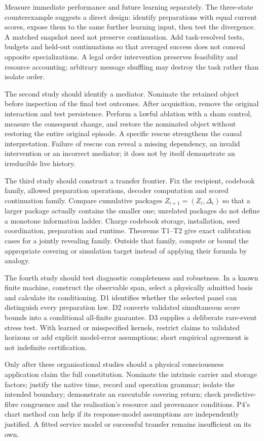 \documentclass[
  11pt,
  a4paper,
]{article}
\begin{document}
Measure immediate performance and future learning separately. The
three-state counterexample suggests a direct design: identify
preparations with equal current scores, expose them to the same further
learning input, then test the divergence. A matched snapshot need not
preserve continuation. Add task-resolved tests, budgets and held-out
continuations so that averaged success does not conceal opposite
specializations. A legal order intervention preserves feasibility and
resource accounting; arbitrary message shuffling may destroy the task
rather than isolate order.

The second study should identify a mediator. Nominate the retained
object before inspection of the final test outcomes. After acquisition,
remove the original interaction and test persistence. Perform a lawful
ablation with a sham control, measure the consequent change, and restore
the nominated object without restoring the entire original episode. A
specific rescue strengthens the causal interpretation. Failure of rescue
can reveal a missing dependency, an invalid intervention or an incorrect
mediator; it does not by itself demonstrate an irreducible live history.

The third study should construct a transfer frontier. Fix the recipient,
codebook family, allowed preparation operations, decoder computation and
scored continuation family. Compare cumulative packages
\(Z_{i+1}=(Z_i,\Delta_i)\) so that a larger package actually contains
the smaller one; unrelated packages do not define a monotone information
ladder. Charge codebook storage, installation, seed coordination,
preparation and runtime. Theorems T1--T2 give exact calibration cases
for a jointly revealing family. Outside that family, compute or bound
the appropriate covering or simulation target instead of applying their
formula by analogy.

The fourth study should test diagnostic completeness and robustness. In
a known finite machine, construct the observable span, select a
physically admitted basis and calculate its conditioning. D1 identifies
whether the selected panel can distinguish every preparation law. D2
converts validated simultaneous score bounds into a conditional
all-finite guarantee. D3 supplies a deliberate rare-event stress test.
With learned or misspecified kernels, restrict claims to validated
horizons or add explicit model-error assumptions; short empirical
agreement is not indefinite certification.

Only after these organisational studies should a physical consciousness
application claim the full constitution. Nominate the intrinsic carrier
and storage factors; justify the native time, record and operation
grammar; isolate the intended boundary; demonstrate an executable
covering return; check predictive-fibre congruence and the realisation's
resource and provenance conditions. P4's chart method can help if its
response-model assumptions are independently justified. A fitted service
model or successful transfer remains insufficient on its own.
\end{document}
